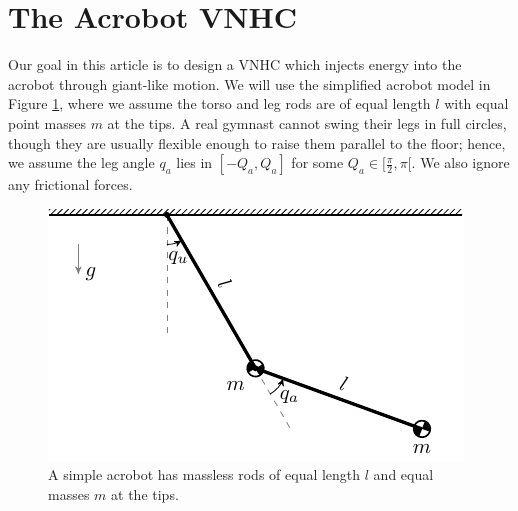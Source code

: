 \documentclass[journal,twoside,web]{ieeecolor}
\begin{document}
\section{The Acrobot VNHC}\label{sec:acrobot}
%
Our goal in this article is to design a VNHC which injects energy into the
acrobot through giant-like motion.
We will use the simplified acrobot model in Figure
\ref{fig:simple-acrobot-model}, where we assume the torso and leg rods are of
equal length \(l\) with equal point masses \(m\) at the tips.
A real gymnast cannot swing their legs in full circles, though they
are usually flexible enough to raise them parallel to the floor;
hence, we assume the leg angle \(q_a\) lies in \([-Q_a, Q_a]\) for some
\(Q_a \in [\frac{\pi}{2}, \pi[\). 
We also ignore any frictional forces.

\begin{figure}
    \centering
    \includegraphics[width=0.7\linewidth]{simple_acrobot_model.pdf}
    \caption{A simple acrobot has massless rods of equal length \(l\) and 
    equal masses \(m\) at the tips.}
    \label{fig:simple-acrobot-model}
\end{figure}
\end{document}
